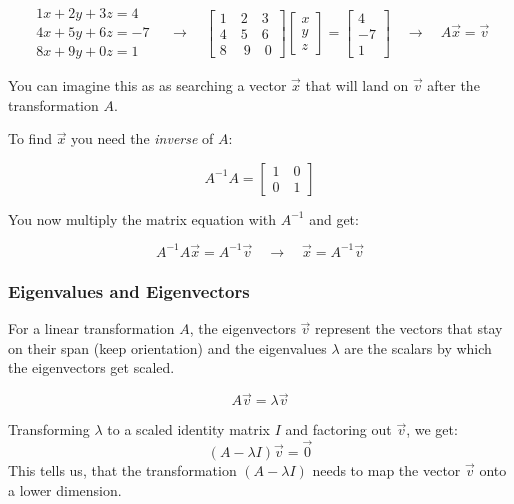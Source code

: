 \documentclass[
]{book}
\begin{document}
\[
\begin{array}{ll} 1x+2y+3z=4 \\ 4x+5y+6z=-7 \\8x + 9y +0z = 1 \end{array}
\quad  \rightarrow  \quad
\begin{bmatrix} 1 \quad 2 \quad 3 \\ 4 \quad 5 \quad 6 \\ 8 \quad \ 9 \quad 0 \end{bmatrix} 
\begin{bmatrix} x \\ y \\ z\end{bmatrix} = 
\begin{bmatrix} 4 \\ -7 \\ 1 \end{bmatrix} 
\quad \rightarrow \quad
A \vec{x} = \vec{v}
\]

You can imagine this as as searching a vector \(\vec{x}\) that will land
on \(\vec{v}\) after the transformation \(A\).

To find \(\vec{x}\) you need the \emph{inverse} of \(A\):

\[
A^{-1}A = \begin{bmatrix} 1 \quad 0 \\ 0 \quad 1 \end{bmatrix}
\]

You now multiply the matrix equation with \(A^{-1}\) and get:

\[
A^{-1} A \vec{x} = A^{-1} \vec{v}
\quad \rightarrow \quad
\vec{x} = A^{-1} \vec{v}
\]

\hypertarget{eigenvalues-and-eigenvectors}{%
\subsubsection{Eigenvalues and Eigenvectors}\label{eigenvalues-and-eigenvectors}}

For a linear transformation \(A\), the eigenvectors \(\vec{v}\) represent
the vectors that stay on their span (keep orientation) and the
eigenvalues \(\lambda\) are the scalars by which the eigenvectors get
scaled.

\[
A \vec{v} = \lambda \vec{v}
\]

Transforming \(\lambda\) to a scaled identity matrix \(I\) and factoring out
\(\vec{v}\), we get: \[
(A - \lambda I) \vec{v} =  \vec{0}
\] This tells us, that the transformation \((A - \lambda I)\) needs to map
the vector \(\vec{v}\) onto a lower dimension.
\end{document}

